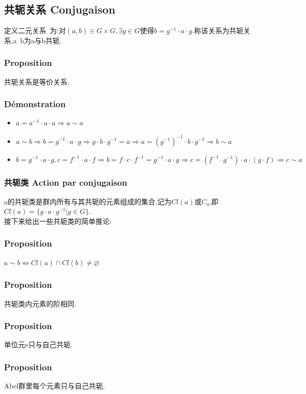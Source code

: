\documentclass[12pt, a4paper, oneside]{ctexbook}
\begin{document}
  \subsection{共轭关系 Conjugaison}\label{myref:共轭关系}
  定义二元关系~为:对$(a,b)\in G\times G, \exists g\in G$使得$b=g^{-1}\cdot a\cdot g$.称该关系为共轭关系,a~b为a与b共轭.
  \subsubsection{Proposition}
  共轭关系是等价关系.
  \subsubsection{Démonstration}
  \begin{itemize}
    \item $a=a^{-1}\cdot a\cdot a\Rightarrow a\sim a$
    \item $a\sim b\Rightarrow b=g^{-1}\cdot a\cdot g\Rightarrow g\cdot b\cdot g^{-1}=a\Rightarrow a=(g^{-1})^{-1}\cdot b\cdot g^{-1}\Rightarrow b\sim a$
    \item $b=g^{-1}\cdot a\cdot g, c=f^{-1}\cdot a\cdot f\Rightarrow b=f\cdot c\cdot f^{-1}=g^{-1}\cdot a\cdot g\Rightarrow c=(f^{-1}\cdot g^{-1})\cdot a\cdot (g\cdot f)\Rightarrow c\sim a$
  \end{itemize}
  \subsubsection{共轭类 Action par conjugaison}
  a的共轭类是群内所有与其共轭的元素组成的集合,记为$Cl(a)$或$C_a$,即$Cl(a)=\{g\cdot a\cdot g^{-1}|g\in G\}$.\\

  接下来给出一些共轭类的简单推论:
  \subsubsection{Proposition}
  $a\sim b\Leftrightarrow Cl(a)\cap Cl(b)\neq \varnothing$
  \subsubsection{Proposition}
  共轭类内元素的阶相同.
  \subsubsection{Proposition}
  单位元e只与自己共轭.
  \subsubsection{Proposition}
  Abel群里每个元素只与自己共轭.
\end{document}
